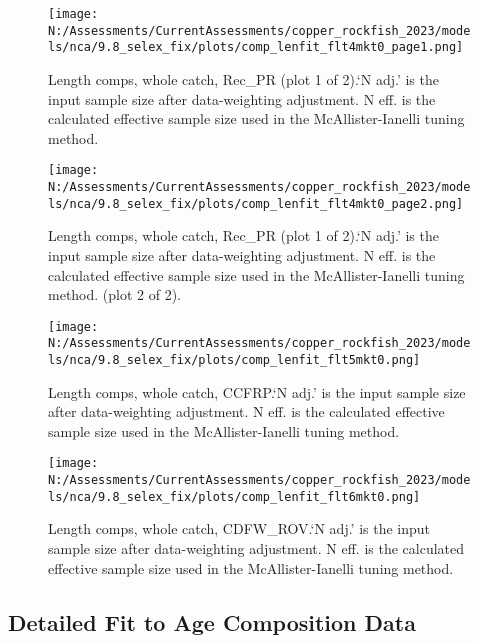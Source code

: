 \documentclass[11pt,
  english,
  letterpaper,
]{article}
\begin{document}
\begin{figure}
\centering
\texttt{[image: N:/Assessments/CurrentAssessments/copper\_rockfish\_2023/models/nca/9.8\_selex\_fix/plots/comp\_lenfit\_flt4mkt0\_page1.png]}
\caption{Length comps, whole catch, Rec\_PR (plot 1 of 2).`N adj.' is the input sample size after data-weighting adjustment. N eff. is the calculated effective sample size used in the McAllister-Ianelli tuning method.\label{fig:comp_lenfit_flt4mkt0_page1}}
\end{figure}

\begin{figure}
\centering
\texttt{[image: N:/Assessments/CurrentAssessments/copper\_rockfish\_2023/models/nca/9.8\_selex\_fix/plots/comp\_lenfit\_flt4mkt0\_page2.png]}
\caption{Length comps, whole catch, Rec\_PR (plot 1 of 2).`N adj.' is the input sample size after data-weighting adjustment. N eff. is the calculated effective sample size used in the McAllister-Ianelli tuning method. (plot 2 of 2).\label{fig:comp_lenfit_flt4mkt0_page2}}
\end{figure}

\begin{figure}
\centering
\texttt{[image: N:/Assessments/CurrentAssessments/copper\_rockfish\_2023/models/nca/9.8\_selex\_fix/plots/comp\_lenfit\_flt5mkt0.png]}
\caption{Length comps, whole catch, CCFRP.`N adj.' is the input sample size after data-weighting adjustment. N eff. is the calculated effective sample size used in the McAllister-Ianelli tuning method.\label{fig:comp_lenfit_flt5mkt0}}
\end{figure}

\begin{figure}
\centering
\texttt{[image: N:/Assessments/CurrentAssessments/copper\_rockfish\_2023/models/nca/9.8\_selex\_fix/plots/comp\_lenfit\_flt6mkt0.png]}
\caption{Length comps, whole catch, CDFW\_ROV.`N adj.' is the input sample size after data-weighting adjustment. N eff. is the calculated effective sample size used in the McAllister-Ianelli tuning method.\label{fig:comp_lenfit_flt6mkt0}}
\end{figure}

\newpage

\hypertarget{age-data}{%
\subsection{Detailed Fit to Age Composition Data}\label{age-data}}
\end{document}
